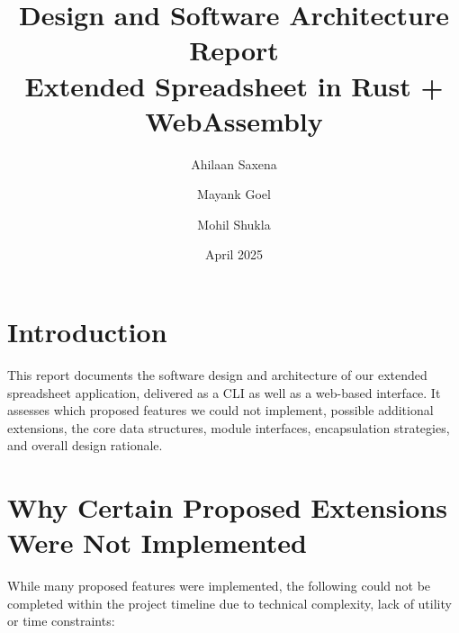 \documentclass[12pt]{article}
\title{Design and Software Architecture Report\\[4pt]
\large Extended Spreadsheet in Rust + WebAssembly}
\author{Ahilaan Saxena \and Mayank Goel \and Mohil Shukla}
\date{April 2025}
\begin{document}
    \maketitle
    \tableofcontents
    \newpage

    \section{Introduction}
    This report documents the software design and architecture of our extended
    spreadsheet application, delivered as a CLI as well as a web-based interface. It assesses which proposed features we could not implement, possible additional extensions, the core data structures, module interfaces, encapsulation strategies, and overall design rationale.

    \section{Why Certain Proposed Extensions Were Not Implemented}
    \label{sec:not-implemented}
    While many proposed features were implemented, the following could not be completed within the project timeline due to technical complexity, lack of utility or time constraints:
\end{document}
